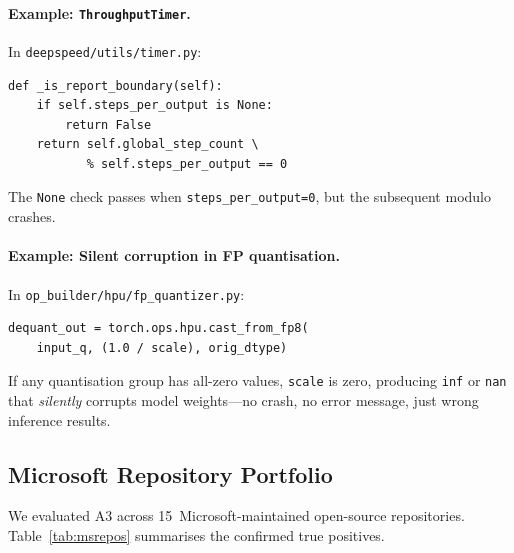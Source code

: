 \documentclass[sigconf,review,anonymous]{acmart}
\begin{document}
\paragraph{Example: \texttt{ThroughputTimer}.}
In \texttt{deepspeed/utils/timer.py}:
\begin{lstlisting}
def _is_report_boundary(self):
    if self.steps_per_output is None:
        return False
    return self.global_step_count \
           % self.steps_per_output == 0
\end{lstlisting}
The \texttt{None} check passes when \texttt{steps\_per\_output=0}, but the subsequent modulo crashes.

\paragraph{Example: Silent corruption in FP quantisation.}
In \texttt{op\_builder/hpu/fp\_quantizer.py}:
\begin{lstlisting}
dequant_out = torch.ops.hpu.cast_from_fp8(
    input_q, (1.0 / scale), orig_dtype)
\end{lstlisting}
If any quantisation group has all-zero values, \texttt{scale} is zero, producing \texttt{inf} or \texttt{nan} that \emph{silently} corrupts model weights---no crash, no error message, just wrong inference results.

\subsection{Microsoft Repository Portfolio}

We evaluated \textsc{A3} across 15~Microsoft-maintained open-source repositories.
Table~\ref{tab:msrepos} summarises the confirmed true positives.
\end{document}
